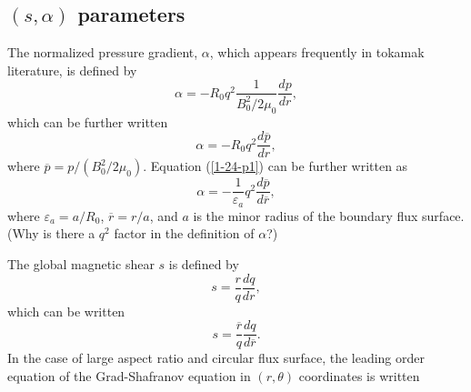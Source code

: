 \documentclass{article}
\begin{document}
\subsection{$(s, \alpha)$ parameters}

The normalized pressure gradient, $\alpha$, which appears frequently in
tokamak literature, is defined by{\cite{berk1995}}
\begin{equation}
  \alpha = - R_0 q^2 \frac{1}{B^2_0 / 2 \mu_0}  \frac{d p}{d r},
\end{equation}
which can be further written
\begin{equation}
  \label{1-24-p1} \alpha = - R_0 q^2  \frac{d \overline{p}}{d r},
\end{equation}
where $\overline{p} = p / (B_0^2 / 2 \mu_0)$. Equation (\ref{1-24-p1}) can be
further written as
\begin{equation}
  \alpha = - \frac{1}{\varepsilon_a} q^2  \frac{d \overline{p}}{d
  \overline{r}},
\end{equation}
where $\varepsilon_a = a / R_0$, $\overline{r} = r / a$, and $a$ is the minor
radius of the boundary flux surface. (Why is there a $q^2$ factor in the
definition of $\alpha$?)

The global magnetic shear $s$ is defined by
\begin{equation}
  s = \frac{r}{q}  \frac{d q}{d r},
\end{equation}
which can be written
\begin{equation}
  s = \frac{\overline{r}}{q}  \frac{d q}{d \overline{r}} .
\end{equation}
In the case of large aspect ratio and circular flux surface, the leading order
equation of the Grad-Shafranov equation in $(r, \theta)$ coordinates is
written
\end{document}
